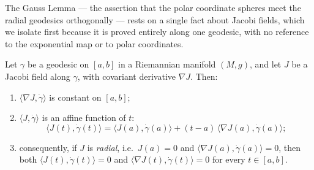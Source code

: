 The Gauss Lemma — the assertion that the polar coordinate spheres meet
the radial geodesics orthogonally — rests on a single fact about Jacobi
fields, which we isolate first because it is proved entirely along one
geodesic, with no reference to the exponential map or to polar
coordinates.

\begin{lemma}
\label{lem:radial-jacobi-orthogonal}
\leanok
Let $\gamma$ be a geodesic on $[a,b]$ in a Riemannian manifold $(M,g)$,
and let $J$ be a Jacobi field along $\gamma$, with covariant derivative
$\nabla J$. Then:
\begin{enumerate}
\item $\langle\nabla J,\dot\gamma\rangle$ is constant on $[a,b]$;
\item $\langle J,\dot\gamma\rangle$ is an affine function of $t$:
$$\langle J(t),\dot\gamma(t)\rangle
=\langle J(a),\dot\gamma(a)\rangle
+(t-a)\,\langle\nabla J(a),\dot\gamma(a)\rangle;$$
\item consequently, if $J$ is {\sl radial}, i.e.\ $J(a)=0$ and
$\langle\nabla J(a),\dot\gamma(a)\rangle=0$, then both
$\langle J(t),\dot\gamma(t)\rangle=0$ and
$\langle\nabla J(t),\dot\gamma(t)\rangle=0$ for every $t\in[a,b]$.
\end{enumerate}
\end{lemma}

